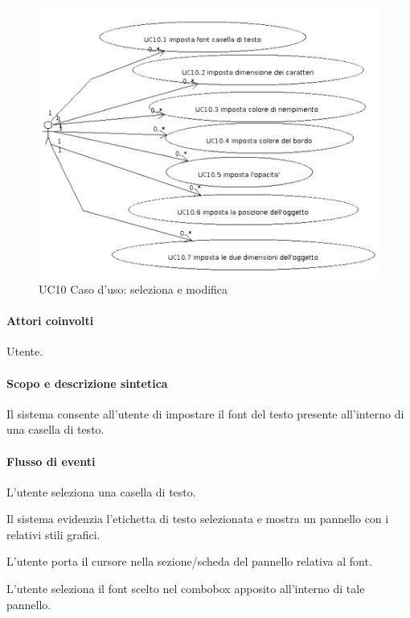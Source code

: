 \begin{figure}[!ht]
\centering
\vspace{20pt} 
\includegraphics{UC10Espanso}
\caption{UC10 Caso d'uso: seleziona e modifica}
\label{uc10}
\end{figure}

\paragraph{Attori coinvolti} Utente.
\paragraph{Scopo e descrizione sintetica} 
Il sistema consente all'utente di impostare il font del testo presente all'interno di una casella di testo.
\paragraph{Flusso di eventi}
\begin{elenconumerato}[\textbf{}]{\subsubsecindent}
\item L'utente seleziona una casella di testo.
\item Il sistema evidenzia l'etichetta di testo selezionata e mostra un pannello con i relativi stili grafici.
\item L'utente porta il cursore nella sezione/scheda del pannello relativa al font.
\item L'utente seleziona il font scelto nel combobox apposito all'interno di tale pannello.
\end{elenconumerato}
